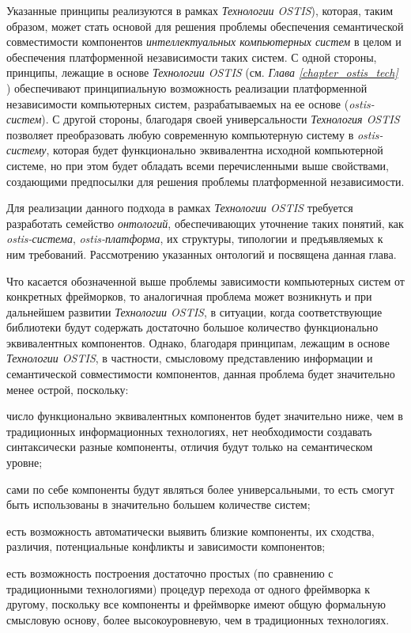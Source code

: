 Указанные принципы реализуются в рамках \textit{Технологии OSTIS}), которая, таким образом, может стать основой для решения проблемы обеспечения семантической совместимости компонентов \textit{интеллектуальных компьютерных систем} в целом и обеспечения платформенной независимости таких систем.
С одной стороны, принципы, лежащие в основе \textit{Технологии OSTIS} (см. \textit{Глава \ref{chapter_ostis_tech} }) обеспечивают принципиальную возможность реализации платформенной независимости компьютерных систем, разрабатываемых на ее основе (\textit{ostis-систем}). С другой стороны, благодаря своей универсальности \textit{Технология OSTIS} позволяет преобразовать любую современную компьютерную систему в \textit{ostis-систему}, которая будет функционально эквивалентна исходной компьютерной системе, но при этом будет обладать всеми перечисленными выше свойствами, создающими предпосылки для решения проблемы платформенной независимости.

Для реализации данного подхода в рамках \textit{Технологии OSTIS} требуется разработать семейство \textit{онтологий}, обеспечивающих уточнение таких понятий, как \textit{ostis-система}, \textit{ostis-платформа}, их структуры, типологии и предъявляемых к ним требований. Рассмотрению указанных онтологий и посвящена данная глава.

Что касается обозначенной выше проблемы зависимости компьютерных систем от конкретных фрейморков, то аналогичная проблема может возникнуть и при дальнейшем развитии \textit{Технологии OSTIS}, в ситуации, когда соответствующие библиотеки будут содержать достаточно большое количество функционально эквивалентных компонентов. Однако, благодаря принципам, лежащим в основе \textit{Технологии OSTIS}, в частности, смысловому представлению информации и семантической совместимости компонентов, данная проблема будет значительно менее острой, поскольку:
\begin{textitemize}
	\item число функционально эквивалентных компонентов будет значительно ниже, чем в традиционных информационных технологиях, нет необходимости создавать синтаксически разные компоненты, отличия будут только на семантическом уровне;
	\item сами по себе компоненты будут являться более универсальными, то есть смогут быть использованы в значительно большем количестве систем;
	\item есть возможность автоматически выявить близкие компоненты, их сходства, различия, потенциальные конфликты и зависимости компонентов;
	\item есть возможность построения достаточно простых (по сравнению с традиционными технологиями) процедур перехода от одного фреймворка к другому, поскольку все компоненты и фреймворке имеют общую формальную смысловую основу, более высокоуровневую, чем в традиционных технологиях.
\end{textitemize}

